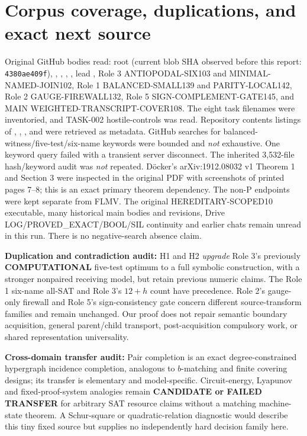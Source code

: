 \documentclass[11pt]{article}
\begin{document}
\section{Corpus coverage, duplications, and exact next source}
Original GitHub bodies read: root  (current blob SHA observed before this report: \texttt{4380ae409f}), , , , , lead , Role 3 ANTIOPODAL-SIX103 and MINIMAL-NAMED-JOIN102, Role 1 BALANCED-SMALL139 and PARITY-LOCAL142, Role 2 GAUGE-FIREWALL132, Role 5 SIGN-COMPLEMENT-GATE145, and MAIN WEIGHTED-TRANSCRIPT-COVER108. The eight task filenames were inventoried, and TASK-002 hostile-controls was read. Repository contents listings of , , ,  and  were retrieved as metadata. GitHub searches for balanced-witness/five-test/six-name keywords were bounded and \emph{not} exhaustive. One keyword query failed with a transient server disconnect. The inherited 3,532-file hash/keyword audit was \emph{not} repeated.
D\"ocker's arXiv:1912.08032 v1 Theorem 1 and Section 3 were inspected in the original PDF with screenshots of printed pages 7--8; this is an exact primary theorem dependency. The non-P endpoints were kept separate from FLMV. The original HEREDITARY-SCOPED10 executable, many historical main bodies and revisions, Drive LOG/PROVED_EXACT/BOOL/SIL continuity and earlier chats remain unread in this run. There is no negative-search absence claim.

\textbf{Duplication and contradiction audit:} H1 and H2 \emph{upgrade} Role 3's previously \textbf{COMPUTATIONAL} five-test optimum to a full symbolic construction, with a stronger nonpaired receiving model, but retain previous numeric claims. The Role 1 six-name all-SAT and Role 3's $12+h$ count have precedence. Role 2's gauge-only firewall and Role 5's sign-consistency gate concern different source-transform families and remain unchanged. Our proof does not repair semantic boundary acquisition, general parent/child transport, post-acquisition compulsory work, or shared representation universality.

\textbf{Cross-domain transfer audit:} Pair completion is an exact degree-constrained hypergraph incidence completion, analogous to $b$-matching and finite covering designs; its transfer is elementary and model-specific. Circuit-energy, Lyapunov and fixed-proof-system analogies remain \textbf{CANDIDATE or FAILED TRANSFER} for arbitrary SAT resource claims without a matching machine-state theorem. A Schur-square or quadratic-relation diagnostic would describe this tiny fixed source but supplies no independently hard decision family here.
\end{document}

